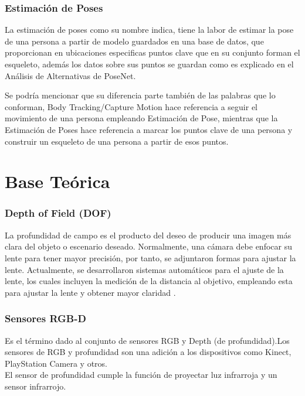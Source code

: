 \subsubsection{Estimación de Poses}

La estimación de poses como su nombre indica, tiene la labor de estimar la pose de una persona a partir de modelo guardados en una base de datos, que proporcionan en ubicaciones especificas puntos clave que en su conjunto forman el esqueleto, además los datos sobre sus puntos se guardan como es explicado en el Análisis de Alternativas de PoseNet.

Se podría mencionar que su diferencia parte también de las palabras que lo conforman, Body Tracking/Capture Motion hace referencia a seguir el movimiento de una persona empleando Estimación de Pose, mientras que la Estimación de Poses hace referencia a marcar los puntos clave de una persona y construir un esqueleto de una persona a partir de esos puntos\cite{oved2018real}.


\section{Base Teórica}

\subsubsection{Depth of Field (DOF)}

La profundidad de campo es el producto del deseo de producir una imagen más clara del objeto o escenario deseado. Normalmente, una cámara debe enfocar su lente para tener mayor precisión, por tanto, se adjuntaron formas para ajustar la lente. Actualmente, se desarrollaron sistemas automáticos para el ajuste de la lente, los cuales incluyen la medición de la distancia al objetivo, empleando esta para ajustar la lente y obtener mayor claridad \cite{madsen2000depth}. 

\subsubsection{Sensores RGB-D} 

Es el término dado al conjunto de sensores RGB y Depth (de profundidad).Los sensores de RGB y profundidad son una adición a los dispositivos como Kinect, PlayStation Camera y otros. 
\\El sensor de profundidad cumple la función de proyectar luz infrarroja y un sensor infrarrojo. 

